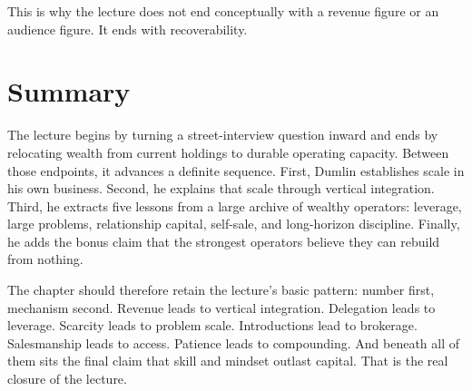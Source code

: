 This is why the lecture does not end conceptually with a revenue figure or an audience figure. It ends with recoverability.

\section{Summary}

The lecture begins by turning a street-interview question inward and ends by relocating wealth from current holdings to durable operating capacity. Between those endpoints, it advances a definite sequence. First, Dumlin establishes scale in his own business. Second, he explains that scale through vertical integration. Third, he extracts five lessons from a large archive of wealthy operators: leverage, large problems, relationship capital, self-sale, and long-horizon discipline. Finally, he adds the bonus claim that the strongest operators believe they can rebuild from nothing.

The chapter should therefore retain the lecture's basic pattern: number first, mechanism second. Revenue leads to vertical integration. Delegation leads to leverage. Scarcity leads to problem scale. Introductions lead to brokerage. Salesmanship leads to access. Patience leads to compounding. And beneath all of them sits the final claim that skill and mindset outlast capital. That is the real closure of the lecture.
